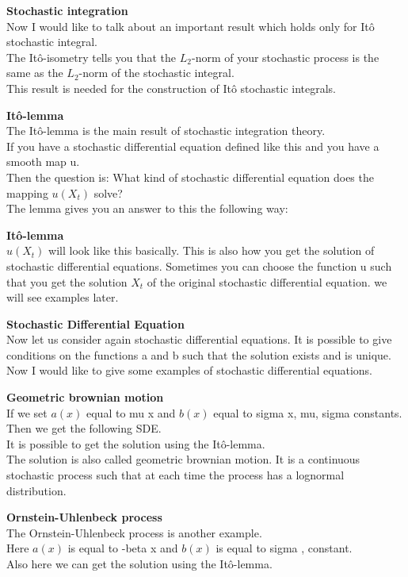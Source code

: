 \documentclass[10pt,a4paper,titlepage, openany]{memoir} %
\begin{document}
\textbf{Stochastic integration}\\
Now I would like to talk about an important result which holds only for It\^o stochastic integral.\\
The It\^o-isometry tells you that the \(L_2\)-norm of your stochastic process is the same as the \(L_2\)-norm of the stochastic integral.\\
This result is needed for the construction of It\^o stochastic integrals.


\textbf{It\^o-lemma}\\
The It\^o-lemma is the main result of stochastic integration theory.\\
If you have a stochastic differential equation defined like this and you have a smooth map u.\\
Then the question is: What kind of stochastic differential equation does the mapping \(u(X_t)\) solve?\\
The lemma gives you an answer to this the following way:

\textbf{It\^o-lemma}\\
\(u(X_t)\) will look like this basically. This is also how you get the solution of stochastic differential equations. Sometimes you can choose the function u such that you get the solution \(X_t\) of the original stochastic differential equation. 
we will see examples later.

\newpage
\textbf{Stochastic Differential Equation}\\
Now let us consider again stochastic differential equations. It is possible to give conditions on the functions a and b such that the solution exists and is unique.\\
Now I would like to give some examples of stochastic differential equations.

\textbf{Geometric brownian motion}\\
If we set \(a(x)\) equal to mu x and \(b(x)\) equal to sigma x, mu, sigma constants. Then we get the following SDE.\\
It is possible to get the solution using the It\^o-lemma.\\
The solution is also called geometric brownian motion. It is a continuous stochastic process such that at each time the process has a lognormal distribution.

\textbf{Ornstein-Uhlenbeck process}\\
The Ornstein-Uhlenbeck process is another example.\\
Here \(a(x)\) is equal to -beta x and \(b(x)\) is equal to sigma , constant.\\
Also here we can get the solution using the It\^o-lemma.
\end{document}
